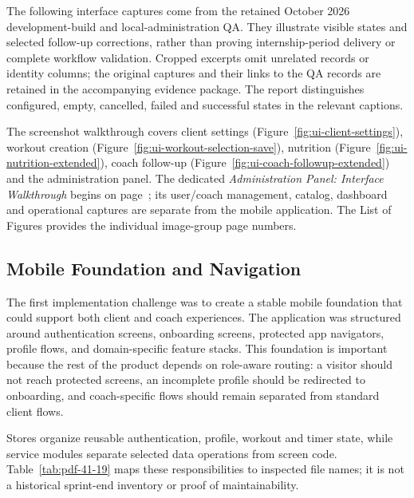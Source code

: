\documentclass[12pt,a4paper,openany]{report}
\begin{document}
The following interface captures come from the retained October 2026 development-build and local-administration QA. They illustrate visible states and selected follow-up corrections, rather than proving internship-period delivery or complete workflow validation. Cropped excerpts omit unrelated records or identity columns; the original captures and their links to the QA records are retained in the accompanying evidence package. The report distinguishes configured, empty, cancelled, failed and successful states in the relevant captions.

The screenshot walkthrough covers client settings (Figure~\ref{fig:ui-client-settings}), workout creation (Figure~\ref{fig:ui-workout-selection-save}), nutrition (Figure~\ref{fig:ui-nutrition-extended}), coach follow-up (Figure~\ref{fig:ui-coach-followup-extended}) and the administration panel. The dedicated \textit{Administration Panel: Interface Walkthrough} begins on page~\pageref{sec:admin-panel-screens}; its user/coach management, catalog, dashboard and operational captures are separate from the mobile application. The List of Figures provides the individual image-group page numbers.

\subsection{Mobile Foundation and Navigation}

The first implementation challenge was to create a stable mobile foundation that could support both client and coach experiences. The application was structured around authentication screens, onboarding screens, protected app navigators, profile flows, and domain-specific feature stacks. This foundation is important because the rest of the product depends on role-aware routing: a visitor should not reach protected screens, an incomplete profile should be redirected to onboarding, and coach-specific flows should remain separated from standard client flows.


Stores organize reusable authentication, profile, workout and timer state, while service modules separate selected data operations from screen code. Table~\ref{tab:pdf-41-19} maps these responsibilities to inspected file names; it is not a historical sprint-end inventory or proof of maintainability.
\end{document}
